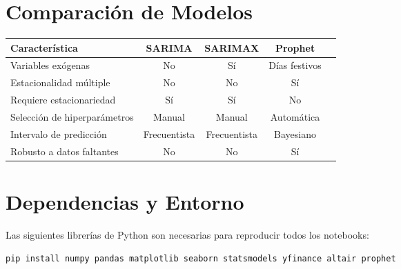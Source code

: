 \documentclass[12pt, a4paper]{article}
\begin{document}
\section{Comparación de Modelos}

\begin{center}
\renewcommand{\arraystretch}{1.5}
\begin{tabular}{lcccc}
  \toprule
  \textbf{Característica} & \textbf{SARIMA} & \textbf{SARIMAX} & \textbf{Prophet} \\
  \midrule
  Variables exógenas       & No  & Sí  & Días festivos \\
  Estacionalidad múltiple  & No  & No  & Sí \\
  Requiere estacionariedad & Sí  & Sí  & No \\
  Selección de hiperparámetros & Manual & Manual & Automática \\
  Intervalo de predicción  & Frecuentista & Frecuentista & Bayesiano \\
  Robusto a datos faltantes & No & No & Sí \\
  \bottomrule
\end{tabular}
\end{center}

\newpage

\section{Dependencias y Entorno}

Las siguientes librerías de Python son necesarias para reproducir todos los
notebooks:

\begin{lstlisting}[language=bash, caption={Instalación de dependencias}]
pip install numpy pandas matplotlib seaborn statsmodels yfinance altair prophet
\end{lstlisting}
\end{document}

